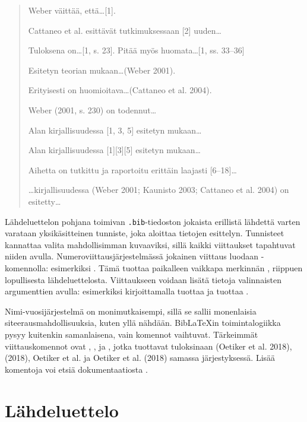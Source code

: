 \begin{quotation}
\noindent Weber väittää, että\ldots [1].

\noindent Cattaneo et al. esittävät tutkimuksessaan [2] uuden\ldots

\noindent Tuloksena on\ldots [1, s. 23]. Pitää myös huomata\ldots [1, ss. 33--36]

\noindent Esitetyn teorian mukaan\ldots (Weber 2001).

\noindent Erityisesti on huomioitava\ldots (Cattaneo et al. 2004).

\noindent Weber (2001, s. 230) on todennut\ldots

\noindent Alan kirjallisuudessa [1, 3, 5] esitetyn mukaan\ldots

\noindent Alan kirjallisuudessa [1][3][5] esitetyn mukaan\ldots

\noindent Aihetta on tutkittu ja raportoitu erittäin laajasti [6--18]\ldots

\noindent\ldots kirjallisuudessa (Weber 2001; Kaunisto 2003; Cattaneo et al. 2004) on esitetty\ldots
\end{quotation}

Lähdeluettelon pohjana toimivan \texttt{.bib}-tiedoston jokaista erillistä lähdettä varten varataan yksikäsitteinen tunniste, joka aloittaa tietojen esittelyn. Tunnisteet kannattaa valita mahdollisimman kuvaaviksi, sillä kaikki viittaukset tapahtuvat niiden avulla. Numeroviittausjärjestelmässä jokainen viittaus luodaan -komennolla: esimerkiksi . Tämä tuottaa paikalleen vaikkapa merkinnän \cite{notsoshort}, riippuen lopullisesta lähdeluettelosta. Viittaukseen voidaan lisätä tietoja valinnaisten argumenttien avulla: esimerkiksi kirjoittamalla  tuottaa \cite[s. 30]{notsoshort} ja  tuottaa \cite[katso][s. 30]{notsoshort}.

Nimi-vuosijärjestelmä on monimutkaisempi, sillä se sallii monenlaisia siteerausmahdollisuuksia, kuten yllä nähdään. Bib\LaTeX{}in toimintalogiikka pysyy kuitenkin samanlaisena, vain komennot vaihtuvat. Tärkeimmät viittauskomennot ovat , ,  ja , jotka tuottavat tuloksinaan (Oetiker et al. 2018), (2018), Oetiker et al. ja Oetiker et al. (2018) samassa järjestyksessä.  Lisää komentoja voi etsiä dokumentaatiosta .

\section{Lähdeluettelo}

